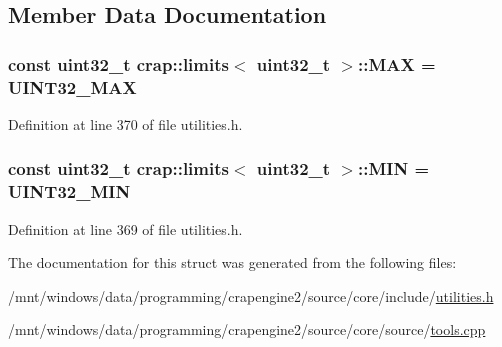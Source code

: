 \subsection{Member Data Documentation}
\hypertarget{structcrap_1_1limits_3_01uint32__t_01_4_aea5412ff2c53d31f208c1f716de7ce63}{
\subsubsection[{M\+A\+X}]{\setlength{\rightskip}{0pt plus 5cm}const uint32\+\_\+t {\bf crap\+::limits}$<$ uint32\+\_\+t $>$\+::M\+A\+X = {\bf U\+I\+N\+T32\+\_\+\+M\+A\+X}\hspace{0.3cm}{\ttfamily [static]}}}\label{structcrap_1_1limits_3_01uint32__t_01_4_aea5412ff2c53d31f208c1f716de7ce63}


Definition at line 370 of file utilities.\+h.

\hypertarget{structcrap_1_1limits_3_01uint32__t_01_4_a0e973ec2df0a7d6a93c5d78cbbdce6bf}{
\subsubsection[{M\+I\+N}]{\setlength{\rightskip}{0pt plus 5cm}const uint32\+\_\+t {\bf crap\+::limits}$<$ uint32\+\_\+t $>$\+::M\+I\+N = {\bf U\+I\+N\+T32\+\_\+\+M\+I\+N}\hspace{0.3cm}{\ttfamily [static]}}}\label{structcrap_1_1limits_3_01uint32__t_01_4_a0e973ec2df0a7d6a93c5d78cbbdce6bf}


Definition at line 369 of file utilities.\+h.



The documentation for this struct was generated from the following files\+:\begin{DoxyCompactItemize}
\item 
/mnt/windows/data/programming/crapengine2/source/core/include/\hyperlink{utilities_8h}{utilities.\+h}\item 
/mnt/windows/data/programming/crapengine2/source/core/source/\hyperlink{tools_8cpp}{tools.\+cpp}\end{DoxyCompactItemize}
